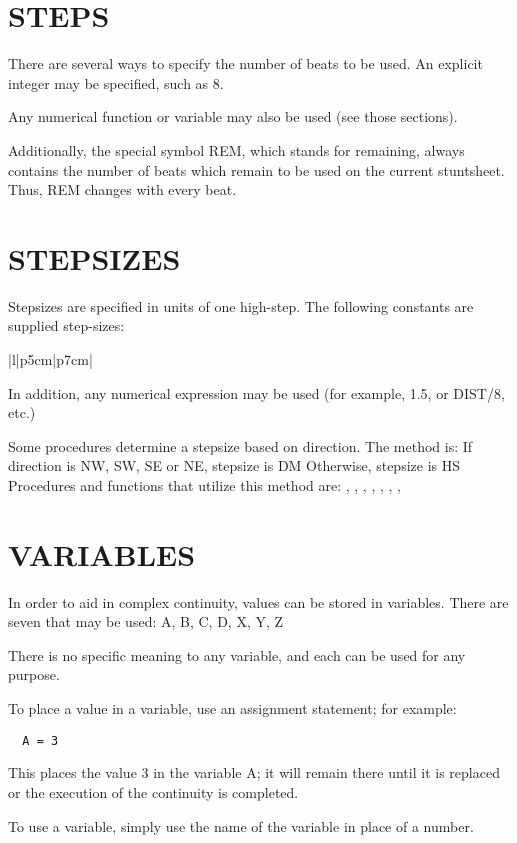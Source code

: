 \section{STEPS}\label{steps}

There are several ways to specify the number of beats to be used.  An
explicit integer may be specified, such as 8.

Any numerical function or variable may also be used (see those sections).

Additionally, the special symbol REM, which stands for remaining, always
contains the number of beats which remain to be used on the current
stuntsheet.  Thus, REM changes with every beat.

\section{STEPSIZES}\label{stepsizes}

Stepsizes are specified in units of one high-step.  The following constants
are supplied step-sizes:

\begin{tabular}{|l|p{5cm}|p{7cm}|}\hline
{}\hline\hline
{}
\end{tabular}

In addition, any numerical expression may be used (for example, 1.5, or
DIST/8, etc.)

Some procedures determine a stepsize based on direction.  The method is:
  If direction is NW, SW, SE or NE, stepsize is DM
  Otherwise,                        stepsize is HS
Procedures and functions that utilize this method are:
  , ,
, ,
, , ,

\section{VARIABLES}\label{variables}

In order to aid in complex continuity, values can be stored in variables.
There are seven that may be used:
  A, B, C, D, X, Y, Z

There is no specific meaning to any variable, and each can be used for any
purpose.

To place a value in a variable, use an assignment statement; for example:
\begin{verbatim}
  A = 3
\end{verbatim}
This places the value 3 in the variable A; it will remain there until it is
replaced or the execution of the continuity is completed.

To use a variable, simply use the name of the variable in place of a number.
